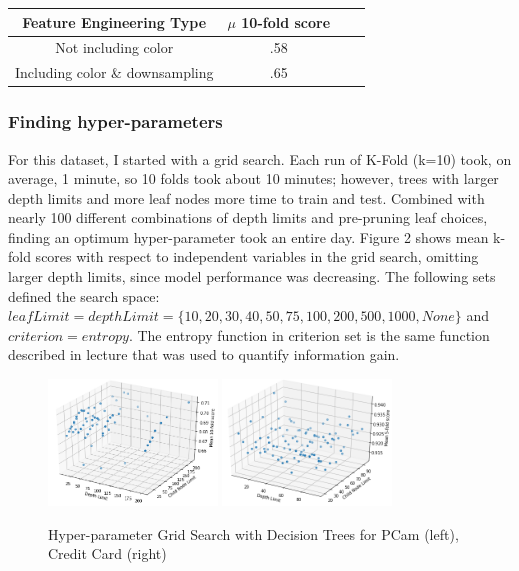 \documentclass[a4paper]{article}
\begin{document}
\begin{center}
\begin{tabular}{ |c|c|c|c| } 
\hline
Feature Engineering Type & \begin{math}\mu\end{math} 10-fold score \\
\hline
Not including color & .58 \\ 
Including color \& downsampling & .65 \\ 

\hline
\end{tabular}
\end{center}
\subsubsection{Finding hyper-parameters}
For this dataset, I started with a grid search. Each run of K-Fold (k=10) took, on average, 1 minute, so 10 folds took about 10 minutes; however, trees with larger depth limits and more leaf nodes more time to train and test. Combined with nearly 100 different combinations of depth limits and pre-pruning leaf choices, finding an optimum hyper-parameter took an entire day. Figure 2 shows mean k-fold scores with respect to independent variables in the grid search, omitting larger depth limits, since model performance was decreasing. The following sets defined the search space: $leafLimit = depthLimit = \{ 10,  20,  30,  40,  50,  75,  100,  200,  500,  1000,  None \}$ and $ criterion = { entropy }$. The entropy function in criterion set is the same function described in lecture that was used to quantify information gain.

\begin{figure}
  \centering
  \includegraphics[width=0.4\textwidth]{images/gridSearch.png}
  \includegraphics[width=0.4\textwidth]{images/gridSearchCredit.png}
  \caption{Hyper-parameter Grid Search with Decision Trees for PCam (left), Credit Card (right)}
\end{figure}
\end{document}
